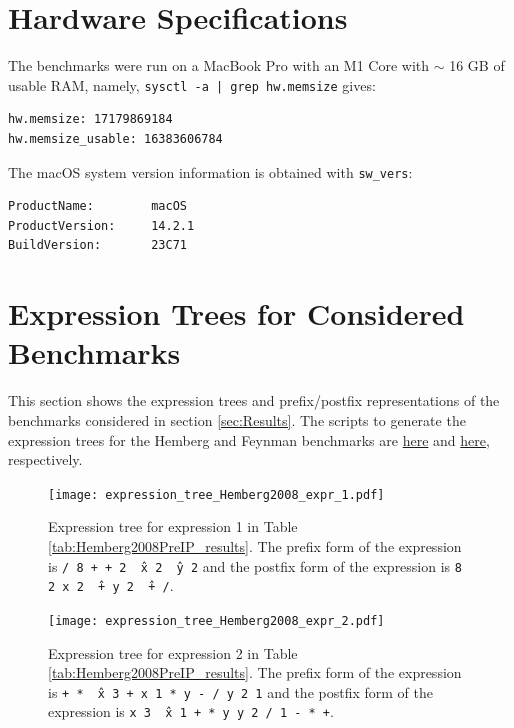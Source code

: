 \documentclass[12pt]{iopart}
\begin{document}

\newpage




\newpage

\appendix
\section{Hardware Specifications}
The benchmarks were run on a MacBook Pro with an M1 Core with $\sim$ 16 GB of usable RAM, namely, \texttt{sysctl -a | grep hw.memsize} gives: 
\begin{verbatim}
hw.memsize: 17179869184
hw.memsize_usable: 16383606784
\end{verbatim}
The macOS system version information is obtained with \texttt{sw\_vers}:
\begin{verbatim}
ProductName:		macOS
ProductVersion:		14.2.1
BuildVersion:		23C71
\end{verbatim}
\section{Expression Trees for Considered Benchmarks} %
This section shows the expression trees and prefix/postfix representations of the benchmarks considered in section \ref{sec:Results}. The scripts to generate the expression trees for the Hemberg and Feynman benchmarks are \href{https://github.com/edfink234/Alpha-Zero-Symbolic-Regression/blob/b57363c6bf1b79cda6e220ebec7c05387e2db971/visualize_tree.py}{here} and \href{https://github.com/edfink234/Alpha-Zero-Symbolic-Regression/blob/b57363c6bf1b79cda6e220ebec7c05387e2db971/AIFeynman.py}{here}, respectively. %

\begin{figure}
    \centering
    \texttt{[image: expression\_tree\_Hemberg2008\_expr\_1.pdf]}
    \caption{Expression tree for expression 1 in Table \ref{tab:Hemberg2008PreIP_results}. The prefix form of the expression is \texttt{/ 8 + + 2 \^\ x 2 \^\ y 2} and the postfix form of the expression is \texttt{8 2 x 2 \^\ + y 2 \^\ + /}. }
    \label{fig:expression_tree_Hemberg2008_expr_1}
\end{figure}

\begin{figure}
    \centering
    \texttt{[image: expression\_tree\_Hemberg2008\_expr\_2.pdf]}
    \caption{Expression tree for expression 2 in Table \ref{tab:Hemberg2008PreIP_results}. The prefix form of the expression is \texttt{+ * \^\ x 3 + x 1 * y - / y 2 1} and the postfix form of the expression is \texttt{x 3 \^\ x 1 + * y y 2 / 1 - * +}. } 
    \label{fig:expression_tree_Hemberg2008_expr_2}
\end{figure}
\end{document}
